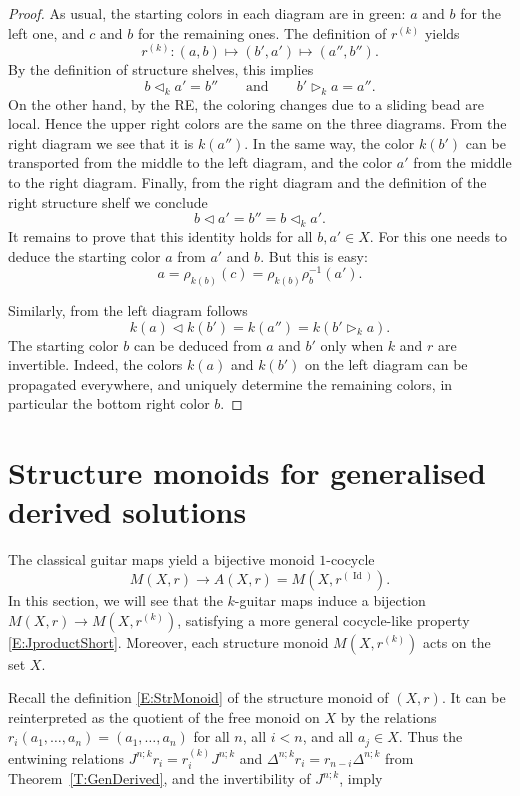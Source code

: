 \documentclass{amsart}
\newcommand{\Z}{\mathbb{Z}}
\newcommand{\Id}{\operatorname{Id}}
\newcommand\op{\mathrel{\triangleleft}}
\newcommand\lop{\mathrel{\triangleright}}
\theoremstyle{plain}
\theoremstyle{definition}
\theoremstyle{remark}
\begin{document}
\begin{proof}
As usual, the starting colors in each diagram are in green: $a$ and $b$ for the left one, and $c$ and $b$ for the remaining ones. The definition of $r^{(k)}$ yields 
\[r^{(k)} \colon (a,b) \mapsto (b',a') \mapsto (a'',b'').\] By the definition of structure shelves, this implies 
\[b \op_k a' =b'' \qquad \text{and} \qquad b' \lop_k a =a''.\] 
On the other hand, by the RE, the coloring changes due to a sliding bead are local. Hence the upper right colors are the same on the three diagrams. From the right diagram we see that it is $k(a'')$. In the same way, the color $k(b')$ can be transported from the middle to the left diagram, and the color $a'$ from the middle to the right diagram. Finally, from the right diagram and the definition of the right structure shelf we conclude 
\[b \op a' = b''= b \op_k a'.\] 
It remains to prove that this identity holds for all $b,a' \in X$. For this one needs to deduce the starting color $a$ from $a'$ and $b$. But this is easy:
\[a=\rho_{k(b)}(c)=\rho_{k(b)}\rho_b^{-1}(a').\]

Similarly, from the left diagram follows
\[k(a) \op k(b') = k(a'') =k(b' \lop_k a).\]
The starting color $b$ can be deduced from $a$ and $b'$ only when $k$ and $r$ are invertible. Indeed, the colors $k(a)$ and $k(b')$ on the left diagram can be propagated everywhere, and uniquely determine the remaining colors, in particular the bottom right color $b$. 
\end{proof}

\section{Structure monoids for generalised derived solutions}

The classical guitar maps yield a bijective monoid $1$-cocycle 
\[M(X,r) \to A(X,r)=M(X,r^{(\Id)}).\] 
In this section, we will see that the $k$-guitar maps induce a bijection $M(X,r) \to M(X,r^{(k)})$, %
satisfying a more general cocycle-like property \eqref{E:JproductShort}. Moreover, each structure monoid $M(X,r^{(k)})$ acts on the set $X$.

Recall the definition \eqref{E:StrMonoid} of the structure monoid of $(X,r)$. It can be reinterpreted as the quotient of the free monoid on $X$ by the relations $r_i(a_1,\ldots,a_n)=(a_1,\ldots,a_n)$ for all $n$, all $i<n$, and all $a_j \in X$. Thus the entwining relations $J^{n;k}r_i=r^{(k)}_iJ^{n;k}$ and $\Delta^{n;k}r_i = r_{n-i}\Delta^{n;k}$ from Theorem~\ref{T:GenDerived}, and the invertibility of $J^{n;k}$, imply
\end{document}
